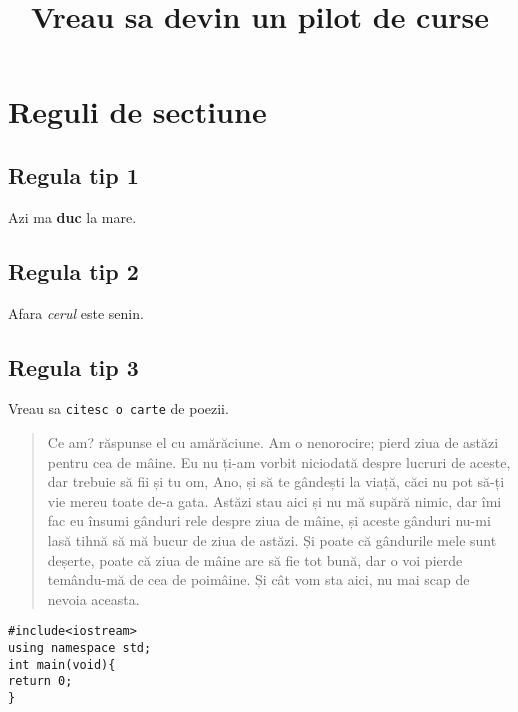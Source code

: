 \documentclass{article}
\begin{document}
\title{Vreau sa devin un pilot de curse}

\section{Reguli de sectiune}

\subsection{Regula tip 1}
Azi ma \textbf{duc} la mare.

\subsection{Regula tip 2}
Afara \textit{cerul} este senin.

\subsection{Regula tip 3}
Vreau sa \texttt{citesc o carte} de poezii.


\begin{quotation}
Ce am? răspunse el cu amărăciune. Am o nenorocire; pierd ziua de astăzi pentru cea de mâine. Eu nu ți-am vorbit niciodată despre lucruri de aceste, dar trebuie să fii și tu om, Ano, și să te gândești la viață, căci nu pot să-ți vie mereu toate de-a gata. Astăzi stau aici și nu mă supără nimic, dar îmi fac eu însumi gânduri rele despre ziua de mâine, și aceste gânduri nu-mi lasă tihnă să mă bucur de ziua de astăzi. Și poate că gândurile mele sunt deșerte, poate că ziua de mâine are să fie tot bună, dar o voi pierde temându-mă de cea de poimâine. Și cât vom sta aici, nu mai scap de nevoia aceasta.
\end{quotation}

\begin{verbatim}
#include<iostream>
using namespace std;
int main(void){
return 0;
}
\end{verbatim}
\end{document}
